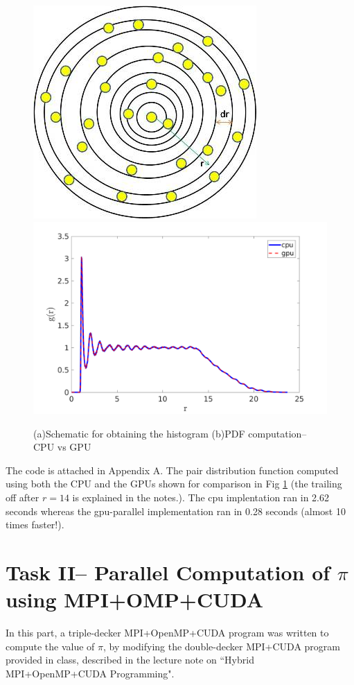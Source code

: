 \documentclass[11pt, oneside]{article}   	%
\begin{document}
\begin{figure}[!htbp] \label{fig:pdf}
	\centering
	\includegraphics[scale=0.87]{pdf_pic.jpg}
	\includegraphics[scale=0.31]{pdf_cpuVsgpu.png}
	\caption{(a)Schematic for obtaining the histogram (b)PDF computation-- CPU vs GPU}
\end{figure}

The code is attached in Appendix A. The pair distribution function computed using both the CPU and the GPUs shown for comparison in Fig \ref{fig:pdf} (the trailing off after $r=14$ is explained in the notes.). The cpu implentation ran in 2.62 seconds whereas the gpu-parallel implementation ran in 0.28 seconds (almost 10 times faster!).



\vspace{-2ex}
\section{Task II-- Parallel Computation of $\pi$ using MPI+OMP+CUDA}
In this part, a triple-decker MPI+OpenMP+CUDA program was written to compute the value of $\pi$, by modifying the double-decker MPI+CUDA program provided in class, described in the lecture note on ``Hybrid MPI+OpenMP+CUDA Programming".
\end{document}
